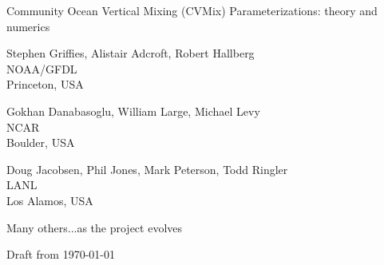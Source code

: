 \documentclass[10pt]{book}
\begin{document}

\thispagestyle{empty}
\vspace{2cm}
\begin{center}
  {\LARGE \sc Community Ocean Vertical Mixing (CVMix)
    Parameterizations: theory and numerics} 
  \\
\end{center}
\vspace{0.5cm}

\begin{center}
  Stephen Grif\/f\/ies, Alistair Adcroft, Robert Hallberg \\
  NOAA/GFDL \\
  Princeton, USA \\
 
 \vspace{.5cm}

 Gokhan Danabasoglu, William Large, Michael Levy \\
 NCAR \\
 Boulder, USA \\

 \vspace{.5cm}

 Doug Jacobsen,  Phil Jones, Mark Peterson, Todd Ringler \\
 LANL \\
 Los Alamos, USA \\


 \vspace{.5cm}

 Many others...as the project evolves

 \vspace{.5cm}

 Draft from \today
\end{center}
\end{document}
